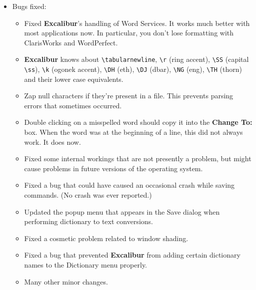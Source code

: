 \documentclass[11pt,titlepage]{article}
\newcommand{\ex}{\textbf{Excalibur}}
\begin{document}
\begin{itemize}

\item Bugs fixed:

  \begin{itemize}

  \item Fixed \ex's handling of Word Services.  It works much better
    with most applications now.  In particular, you don't lose
    formatting with ClarisWorks and WordPerfect.

  \item \ex{} knows about \verb+\tabularnewline+, \verb+\r+ (ring
    accent), \verb+\SS+ (capital \verb+\ss+), \verb+\k+ (ogonek
    accent), \verb+\DH+ (eth), \verb+\DJ+ (dbar), \verb+\NG+ (eng),
    \verb+\TH+ (thorn) and their lower case equivalents.

  \item Zap null characters if they're present in a file.  This
    prevents parsing errors that sometimes occurred.

  \item Double clicking on a misspelled word should copy it into the
    \textbf{Change To:} box.  When the word was at the beginning of a
    line, this did not always work.  It does now.

  \item Fixed some internal workings that are not presently a problem,
    but might cause problems in future versions of the operating
    system.

  \item Fixed a bug that could have caused an occasional crash while
    saving commands.  (No crash was ever reported.)

  \item Updated the popup menu that appears in the Save dialog when
    performing dictionary to text conversions.

  \item Fixed a cosmetic problem related to window shading.

  \item Fixed a bug that prevented \ex{} from adding certain
    dictionary names to the Dictionary menu properly.

  \item Many other minor changes.

  \end{itemize}

\end{itemize}
\end{document}
